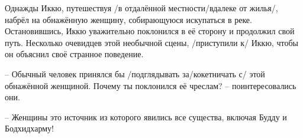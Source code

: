 \begin{ver}
  Однажды Иккю, путешествуя /в отдалённой местности/вдалеке от
  жилья/, набрёл на обнажённую женщину, собирающуюся
  искупаться в реке. Остановившись, Иккю уважительно поклонился в её
  сторону и продолжил свой путь. Несколько очевидцев этой
  необычной сцены, /приступили к/ Иккю, чтобы он
  объяснил своё странное поведение.
\end{ver}

\begin{ver}
  -- Обычный человек принялся бы /подглядывать за/кокетничать с/ этой
  обнажённой женщиной. Почему ты поклонился её чреслам? --
  поинтересовались они.

  -- Женщины это источник из которого явились все существа, включая
  Будду и Бодхидхарму!
\end{ver}

